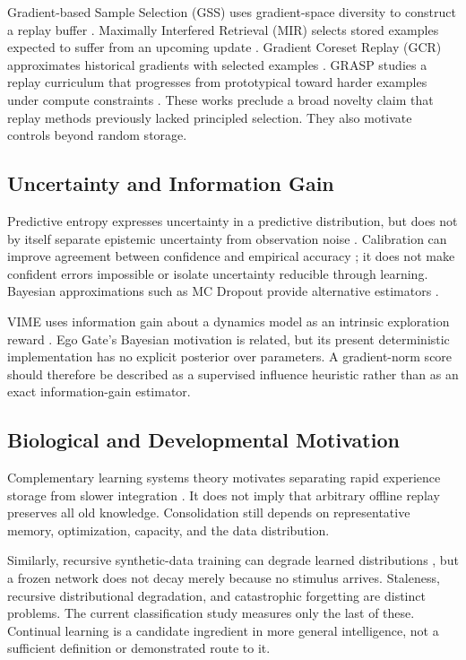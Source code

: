 \documentclass[conference]{IEEEtran}
\begin{document}
Gradient-based Sample Selection (GSS) uses gradient-space diversity to construct a replay buffer \cite{gss}. Maximally Interfered Retrieval (MIR) selects stored examples expected to suffer from an upcoming update \cite{mir}. Gradient Coreset Replay (GCR) approximates historical gradients with selected examples \cite{gcr}. GRASP studies a replay curriculum that progresses from prototypical toward harder examples under compute constraints \cite{grasp}. These works preclude a broad novelty claim that replay methods previously lacked principled selection. They also motivate controls beyond random storage.

\subsection{Uncertainty and Information Gain}
Predictive entropy expresses uncertainty in a predictive distribution, but does not by itself separate epistemic uncertainty from observation noise \cite{kendall}. Calibration can improve agreement between confidence and empirical accuracy \cite{guo}; it does not make confident errors impossible or isolate uncertainty reducible through learning. Bayesian approximations such as MC Dropout provide alternative estimators \cite{gal}.

VIME uses information gain about a dynamics model as an intrinsic exploration reward \cite{vime}. Ego Gate's Bayesian motivation is related, but its present deterministic implementation has no explicit posterior over parameters. A gradient-norm score should therefore be described as a supervised influence heuristic rather than as an exact information-gain estimator.

\subsection{Biological and Developmental Motivation}
Complementary learning systems theory motivates separating rapid experience storage from slower integration \cite{cls}. It does not imply that arbitrary offline replay preserves all old knowledge. Consolidation still depends on representative memory, optimization, capacity, and the data distribution.

Similarly, recursive synthetic-data training can degrade learned distributions \cite{collapse}, but a frozen network does not decay merely because no stimulus arrives. Staleness, recursive distributional degradation, and catastrophic forgetting are distinct problems. The current classification study measures only the last of these. Continual learning is a candidate ingredient in more general intelligence, not a sufficient definition or demonstrated route to it.
\end{document}
